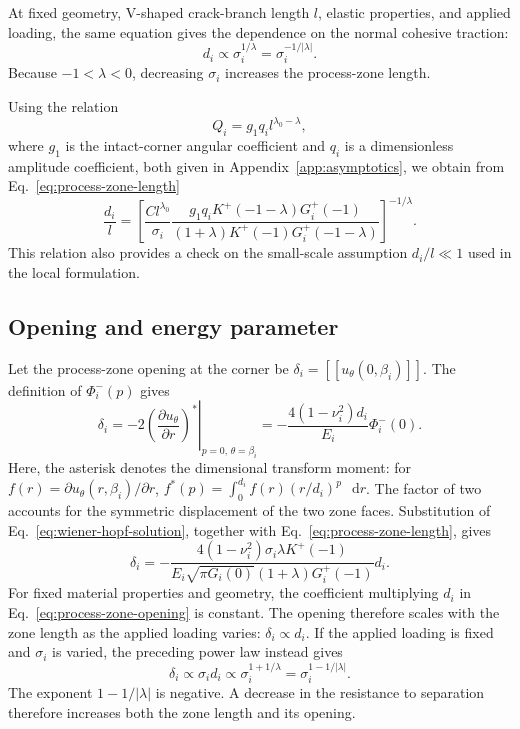\documentclass[pdflatex,onecolumn,sn-mathphys-ay]{sn-jnl}
\newcommand{\dd}{\mathop{}\!\mathrm{d}}
\newcommand{\jump}[1]{\left[\!\left[#1\right]\!\right]}
\begin{document}
At fixed geometry, V-shaped crack-branch length $l$, elastic properties,
and applied loading, the same equation gives the dependence on the normal cohesive
traction:
\begin{equation*}
  d_i\propto \sigma_i^{1/\lambda}
  =\sigma_i^{-1/|\lambda|}.
\end{equation*}
Because $-1<\lambda<0$, decreasing $\sigma_i$ increases the
process-zone length.

Using the relation
\begin{equation*}
  Q_i=g_1q_i l^{\lambda_0-\lambda},
\end{equation*}
where $g_1$ is the intact-corner angular coefficient and $q_i$ is a
dimensionless amplitude coefficient, both given in
Appendix~\ref{app:asymptotics}, we obtain from
Eq.~\eqref{eq:process-zone-length}
\begin{equation}
\label{eq:normalized-process-zone-length}
  \frac{d_i}{l}=
  \left[
    \frac{Cl^{\lambda_0}}{\sigma_i}
    \frac{g_1q_iK^+(-1-\lambda)G_i^+(-1)}
    {(1+\lambda)K^+(-1)G_i^+(-1-\lambda)}
  \right]^{-1/\lambda}.
\end{equation}
This relation also provides a check on the small-scale assumption
$d_i/l\ll1$ used in the local formulation.

\subsection{Opening and energy parameter}
\label{subsec:zone-parameters}

Let the process-zone opening at the corner be
$\delta_i=\jump{u_\theta(0,\beta_i)}$.
The definition of $\Phi_i^-(p)$ gives
\begin{equation*}
  \delta_i
  =-2
    \left.
      \left(\frac{\partial u_\theta}{\partial r}\right)^*
    \right|_{p=0,\,\theta=\beta_i}
  =-\frac{4(1-\nu_i^2)d_i}{E_i}\Phi_i^-(0).
\end{equation*}
Here, the asterisk denotes the dimensional transform moment:
for $f(r)=\partial u_\theta(r,\beta_i)/\partial r$,
$f^*(p)=\int_0^{d_i}f(r)(r/d_i)^p\,\dd r$.
The factor of two accounts for the symmetric displacement of the two
zone faces. Substitution of Eq.~\eqref{eq:wiener-hopf-solution},
together with Eq.~\eqref{eq:process-zone-length}, gives
\begin{equation}
\label{eq:process-zone-opening}
  \delta_i=
  -\frac{4(1-\nu_i^2)\sigma_i\lambda K^+(-1)}
  {E_i\sqrt{\pi G_i(0)}(1+\lambda)G_i^+(-1)}d_i.
\end{equation}
For fixed material properties and geometry, the coefficient multiplying
$d_i$ in Eq.~\eqref{eq:process-zone-opening} is constant. The opening
therefore scales with the zone length as the applied loading varies:
$\delta_i\propto d_i$. If the applied loading is fixed and $\sigma_i$
is varied, the preceding power law instead gives
\begin{equation*}
  \delta_i\propto \sigma_i d_i
  \propto \sigma_i^{1+1/\lambda}
  =\sigma_i^{1-1/|\lambda|}.
\end{equation*}
The exponent $1-1/|\lambda|$ is negative. A decrease in the resistance
to separation therefore increases both the zone length and its opening.
\end{document}
